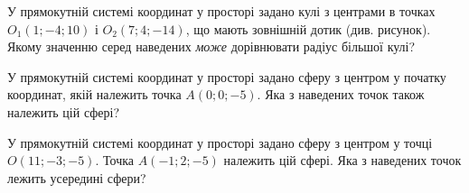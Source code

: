 \documentclass[12pt]{article}
\begin{document}
\begin{samepage}
\noindent
\begin{minipage}[c]{0.56\textwidth}
\zadnum У прямокутній системі координат у просторі задано кулі з центрами в точках $O_1(1; -4; 10)$ і $O_2(7; 4; -14)$, що мають зовнішній дотик (див. рисунок). Якому значенню серед наведених \textit{може} дорівнювати радіус більшої кулі? 
\end{minipage}%
\hfill
\begin{minipage}[c]{0.40\textwidth}
\centering
\begin{nmtfit}\end{nmtfit}
\end{minipage}
\par\nbvspace{0.2cm}

\nopagebreak\nbvspace{-0.3cm}

\nmtnobreak
\nopagebreak\nbvspace{0.5cm}
\par{}\vspace{0.25cm}
\end{samepage}

\begin{samepage}
\noindent\zadnum У прямокутній системі координат у просторі задано сферу з центром у початку координат, якій належить точка $A(0; 0; -5)$. Яка з наведених точок також належить цій сфері? 

\nmtnobreak
\nopagebreak\nbvspace{0.3cm}

\nmtnobreak
\nopagebreak\nbvspace{0.5cm}
\par{}\vspace{0.25cm}
\end{samepage}

\begin{samepage}
\noindent\zadnum У прямокутній системі координат у просторі задано сферу з центром у точці $O(11; -3; -5)$. Точка $A(-1; 2; -5)$ належить цій сфері. Яка з наведених точок лежить усередині сфери? 

\nmtnobreak
\nopagebreak\nbvspace{0.3cm}

\nmtnobreak
\nopagebreak\nbvspace{0.5cm}
\par{}\vspace{0.25cm}
\end{samepage}
\end{document}
